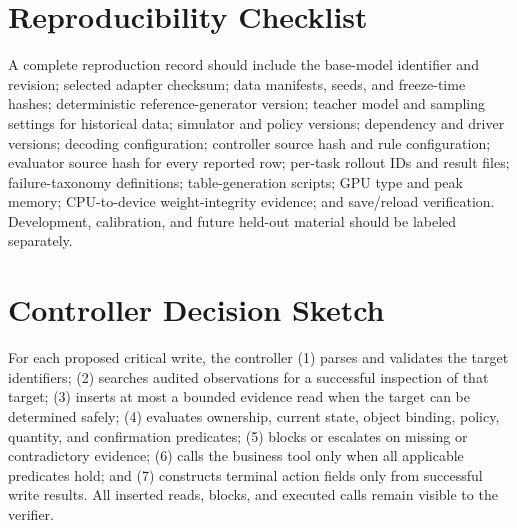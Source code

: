 \documentclass[11pt]{article}
\begin{document}
\section{Reproducibility Checklist}
\label{app:repro}

A complete reproduction record should include the base-model identifier and revision; selected adapter checksum; data manifests, seeds, and freeze-time hashes; deterministic reference-generator version; teacher model and sampling settings for historical data; simulator and policy versions; dependency and driver versions; decoding configuration; controller source hash and rule configuration; evaluator source hash for every reported row; per-task rollout IDs and result files; failure-taxonomy definitions; table-generation scripts; GPU type and peak memory; CPU-to-device weight-integrity evidence; and save/reload verification. Development, calibration, and future held-out material should be labeled separately.

\section{Controller Decision Sketch}
\label{app:pseudocode}

For each proposed critical write, the controller (1) parses and validates the target identifiers; (2) searches audited observations for a successful inspection of that target; (3) inserts at most a bounded evidence read when the target can be determined safely; (4) evaluates ownership, current state, object binding, policy, quantity, and confirmation predicates; (5) blocks or escalates on missing or contradictory evidence; (6) calls the business tool only when all applicable predicates hold; and (7) constructs terminal action fields only from successful write results. All inserted reads, blocks, and executed calls remain visible to the verifier.
\end{document}

